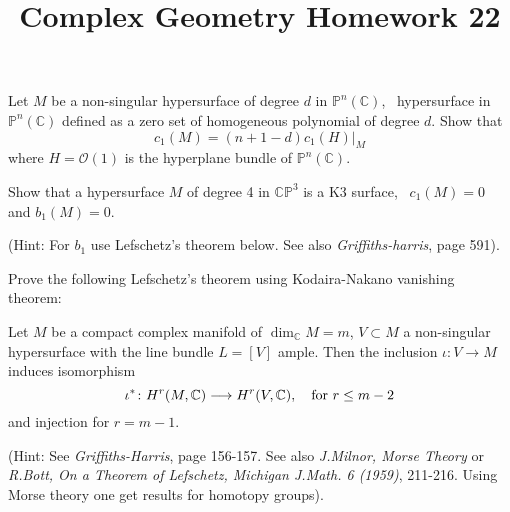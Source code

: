 \documentclass[12pt]{article}
\title{Complex Geometry Homework 22}
\author{}
\date{}
\begin{document}
\maketitle
\begin{problem}
  Let \(M\) be a non-singular hypersurface of degree \(d\) in \(\mathbb{P}^n
  (\mathbb{C})\), \ie\ hypersurface in \(\mathbb{P}^n(\mathbb{C})\) defined as
  a zero set of homogeneous polynomial of degree \(d\). Show that \[
    c_1(M)=(n+1-d)c_1(H)\big|_M
  \] where \(H=\mathcal{O}(1)\) is the hyperplane bundle of \(\mathbb{P}^n
  (\mathbb{C})\).
\end{problem}
\begin{problem}
  Show that a hypersurface \(M\) of degree 4 in \(\mathbb{CP}^3\) is a
  K3 surface, \ie\ \(c_1(M)=0\) and \(b_1(M)=0\).

  (Hint: For \(b_1\) use Lefschetz's theorem below. See also
  \emph{Griffiths-harris}, page 591).
\end{problem}
\begin{problem}
  Prove the following Lefschetz's theorem using Kodaira-Nakano vanishing
  theorem:

  Let \(M\) be a compact complex manifold of \(\dim_{\mathbb{C}}M=m\),
  \(V\subset M\) a non-singular hypersurface with the line bundle \(L=[V]\)
  ample. Then the inclusion \(\iota\colon V\to M\) induces isomorphism \[
    \iota^*\colon H^r(M,\mathbb{C})\longrightarrow H^r(V,\mathbb{C}),\quad
    \text{for }r\le m-2
  \] and injection for \(r=m-1\).

  (Hint: See \emph{Griffiths-Harris}, page 156-157. See also
  \emph{J.Milnor, Morse Theory} or \emph{R.Bott, On a Theorem of Lefschetz,
  Michigan J.Math. 6 (1959)}, 211-216. Using Morse theory one get results for
  homotopy groups).
\end{problem}
\end{document}
